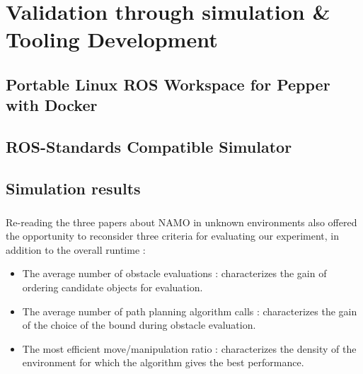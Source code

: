 
\chapter{Validation through simulation \& Tooling Development} %

\label{Chapter5} %

\section{Portable Linux ROS Workspace for Pepper with Docker}

\section{ROS-Standards Compatible Simulator}

\section{Simulation results}

\paragraph{} Re-reading the three papers about NAMO in unknown environments also offered the opportunity to reconsider three criteria for evaluating our experiment, in addition to the overall runtime :

\begin{itemize}
  \item The average number of obstacle evaluations : characterizes the gain of ordering candidate objects for evaluation.
  \item The average number of path planning algorithm calls : characterizes the gain of the choice of the bound during obstacle evaluation.
  \item The most efficient move/manipulation ratio : characterizes the density of the environment for which the algorithm gives the best performance.
\end{itemize}
